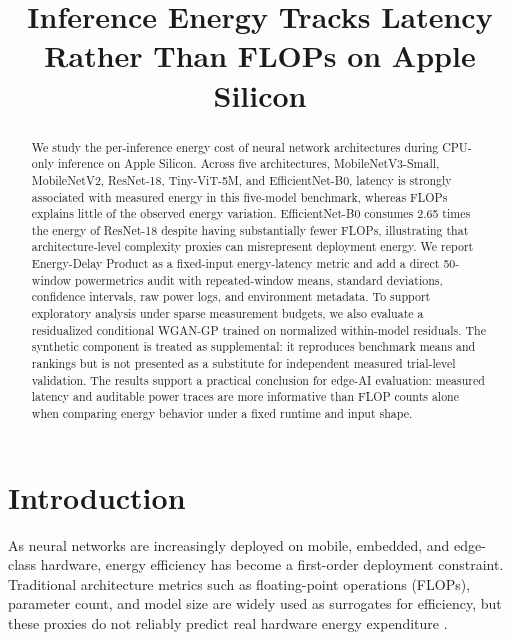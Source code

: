 \documentclass{svproc}
\begin{document}
\mainmatter

\title{Inference Energy Tracks Latency Rather Than FLOPs on Apple Silicon}
\author{}
\authorrunning{}
\tocauthor{}
\institute{}
\maketitle

\begin{abstract}
We study the per-inference energy cost of neural network architectures during CPU-only inference on Apple Silicon. Across five architectures, MobileNetV3-Small, MobileNetV2, ResNet-18, Tiny-ViT-5M, and EfficientNet-B0, latency is strongly associated with measured energy in this five-model benchmark, whereas FLOPs explains little of the observed energy variation. EfficientNet-B0 consumes 2.65 times the energy of ResNet-18 despite having substantially fewer FLOPs, illustrating that architecture-level complexity proxies can misrepresent deployment energy. We report Energy-Delay Product as a fixed-input energy-latency metric and add a direct 50-window powermetrics audit with repeated-window means, standard deviations, confidence intervals, raw power logs, and environment metadata. To support exploratory analysis under sparse measurement budgets, we also evaluate a residualized conditional WGAN-GP trained on normalized within-model residuals. The synthetic component is treated as supplemental: it reproduces benchmark means and rankings but is not presented as a substitute for independent measured trial-level validation. The results support a practical conclusion for edge-AI evaluation: measured latency and auditable power traces are more informative than FLOP counts alone when comparing energy behavior under a fixed runtime and input shape.
\end{abstract}

\section{Introduction}
As neural networks are increasingly deployed on mobile, embedded, and
edge-class hardware, energy efficiency has become a first-order deployment
constraint. Traditional architecture metrics such as floating-point operations
(FLOPs), parameter count, and model size are widely used as surrogates for
efficiency, but these proxies do not reliably predict real hardware energy
expenditure \cite{horowitz2014,mittal2019,hardwareaware2019,eyeriss2017}.
\end{document}

